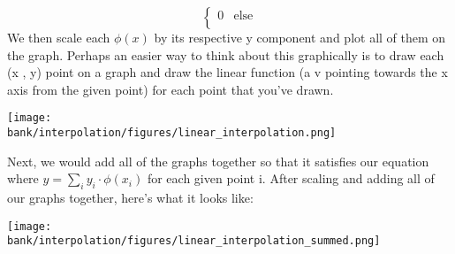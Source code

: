 \begin{enumerate}
{\begin{equation*}
\begin{cases}
	      			0 & \text{else} \\
	   		    \end{cases}
	\end{equation*}
	We then scale each $\phi(x)$ by its respective y component and plot all of them on the graph.
		Perhaps an easier way to think about this graphically is to draw each (x , y) point on a graph and draw the linear function (a v pointing towards the x axis from the given point) for each point that you’ve drawn.
		\begin{center}
    		\texttt{[image: \\bank/interpolation/figures/linear\_interpolation.png]}
	  	\end{center}
		Next, we would add all of the graphs together so that it satisfies our equation where $y = \sum_i{y_i \cdot \phi(x_i)}$ for each given point i. After scaling and adding all of our graphs together, here’s what it looks like:
		\begin{center}
    		\texttt{[image: \\bank/interpolation/figures/linear\_interpolation\_summed.png]}
	  	\end{center}
	}




\end{enumerate}
